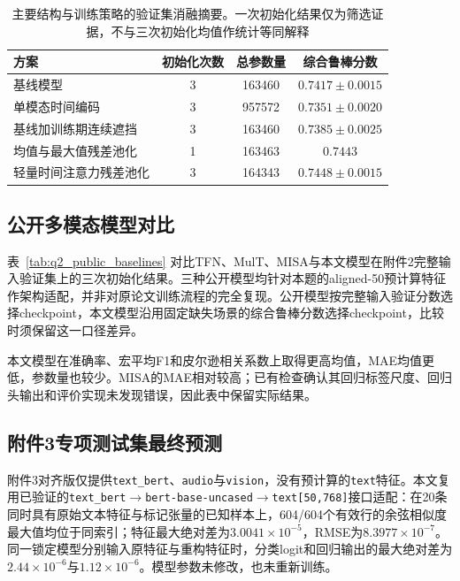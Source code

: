 \begin{table}[htbp]
\centering\small
\caption{主要结构与训练策略的验证集消融摘要。一次初始化结果仅为筛选证据，不与三次初始化均值作统计等同解释}
\label{tab:q2_ablation}
\begin{tabular}{@{}lccc@{}}
\toprule
方案 & 初始化次数 & 总参数量 & 综合鲁棒分数\\
\midrule
基线模型 & 3 & 163460 & $0.7417\pm0.0015$\\
单模态时间编码 & 3 & 957572 & $0.7351\pm0.0020$\\
基线加训练期连续遮挡 & 3 & 163460 & $0.7385\pm0.0025$\\
均值与最大值残差池化 & 1 & 163463 & $0.7443$\\
轻量时间注意力残差池化 & 3 & 164343 & $0.7448\pm0.0015$\\
\bottomrule
\end{tabular}
\end{table}

\FloatBarrier
\subsection{公开多模态模型对比}\label{subsec:q2_public_baselines}
表~\ref{tab:q2_public_baselines} 对比TFN、MulT、MISA与本文模型在附件2完整输入验证集上的三次初始化结果。三种公开模型均针对本题的aligned-50预计算特征作架构适配，并非对原论文训练流程的完全复现。公开模型按完整输入验证分数选择checkpoint，本文模型沿用固定缺失场景的综合鲁棒分数选择checkpoint，比较时须保留这一口径差异。



本文模型在准确率、宏平均F1和皮尔逊相关系数上取得更高均值，MAE均值更低，参数量也较少。MISA的MAE相对较高；已有检查确认其回归标签尺度、回归头输出和评价实现未发现错误，因此表中保留实际结果。

\FloatBarrier
\subsection{附件3专项测试集最终预测}\label{subsec:q2_attachment3}
附件3对齐版仅提供\texttt{text\_bert}、\texttt{audio}与\texttt{vision}，没有预计算的\texttt{text}特征。本文复用已验证的\texttt{text\_bert}$\rightarrow$\texttt{bert-base-uncased}$\rightarrow$\texttt{text[50,768]}接口适配：在20条同时具有原始文本特征与标记张量的已知样本上，604/604个有效行的余弦相似度最大值均位于同索引；特征最大绝对差为$3.0041\times10^{-5}$，RMSE为$8.3977\times10^{-7}$。同一锁定模型分别输入原特征与重构特征时，分类logit和回归输出的最大绝对差为$2.44\times10^{-6}$与$1.12\times10^{-6}$。模型参数未修改，也未重新训练。

